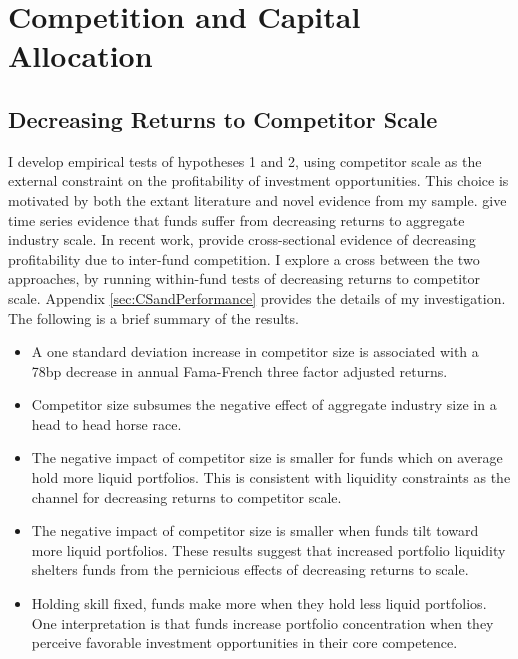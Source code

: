 \documentclass[openany]{book}
\providecommand{\tightlist}{%
  \setlength{\itemsep}{0pt}\setlength{\parskip}{0pt}}
\theoremstyle{definition}
\theoremstyle{definition}
\theoremstyle{definition}
\theoremstyle{remark}
\begin{document}
\chapter{Competition and Capital Allocation}\label{sec:portfolio}

\section{Decreasing Returns to Competitor
Scale}\label{decreasing-returns-to-competitor-scale}

I develop empirical tests of hypotheses 1 and 2, using competitor scale
as the external constraint on the profitability of investment
opportunities. This choice is motivated by both the extant literature
and novel evidence from my sample. \citet{pst15} give time series
evidence that funds suffer from decreasing returns to aggregate industry
scale. In recent work, \citet{hkp17} provide cross-sectional evidence of
decreasing profitability due to inter-fund competition. I explore a
cross between the two approaches, by running within-fund tests of
decreasing returns to competitor scale. Appendix
\ref{sec:CSandPerformance} provides the details of my investigation. The
following is a brief summary of the results.

\begin{itemize}
\tightlist
\item
  A one standard deviation increase in competitor size is associated
  with a 78bp decrease in annual Fama-French three factor adjusted
  returns.
\item
  Competitor size subsumes the negative effect of aggregate industry
  size in a head to head horse race.
\item
  The negative impact of competitor size is smaller for funds which on
  average hold more liquid portfolios. This is consistent with liquidity
  constraints as the channel for decreasing returns to competitor scale.
\item
  The negative impact of competitor size is smaller when funds tilt
  toward more liquid portfolios. These results suggest that increased
  portfolio liquidity shelters funds from the pernicious effects of
  decreasing returns to scale.
\item
  Holding skill fixed, funds make more when they hold less liquid
  portfolios. One interpretation is that funds increase portfolio
  concentration when they perceive favorable investment opportunities in
  their core competence.
\end{itemize}
\end{document}
